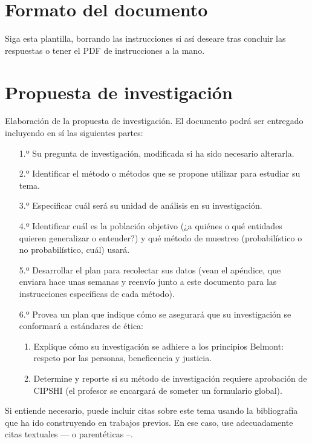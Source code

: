 \documentclass[11pt]{article}
\begin{document}
\section*{Formato del documento}
Siga esta plantilla, borrando las instrucciones si así deseare tras concluir las respuestas o tener el PDF de instrucciones a la mano. 
\onehalfspacing
\section*{Propuesta de investigación}
Elaboración de la propuesta de investigación. El documento podrá ser entregado incluyendo en sí las siguientes partes:

\begin{enumerate}
    \item[1.º] Su pregunta de investigación, modificada si ha sido necesario alterarla.
    \item[2.º] Identificar el método o métodos que se propone utilizar para estudiar su tema.
    \item[3.º] Especificar cuál será su unidad de análisis en su investigación.
    \item[4.º] Identificar cuál es la población objetivo (¿a quiénes o qué entidades quieren generalizar o entender?) y qué método de muestreo (probabilístico o no probabilístico, cuál) usará.
    \item[5.º] Desarrollar el plan para recolectar sus datos (vean el apéndice, que enviara hace unas semanas y reenvío junto a este documento para las instrucciones específicas de cada método).
    \item[6.º] Provea un plan que indique cómo se asegurará que su investigación se conformará a estándares de ética:
    \begin{enumerate}
        \item Explique cómo su investigación se adhiere a los principios Belmont: respeto por las personas, beneficencia y justicia.
        \item Determine y reporte si su método de investigación requiere aprobación de CIPSHI (el profesor se encargará de someter un formulario global).
    \end{enumerate}
\end{enumerate}

Si entiende necesario, puede incluir citas sobre este tema usando la bibliografía que ha ido construyendo en trabajos previos. En ese caso, use adecuadamente citas textuales --\citet{hall2001introduction}-- o parentéticas --\citep[e.g.,][, entre otros]{hall2009institutional}.

\printbibliography[title={Bibliografía}, heading=subbibliography]
\end{document}
